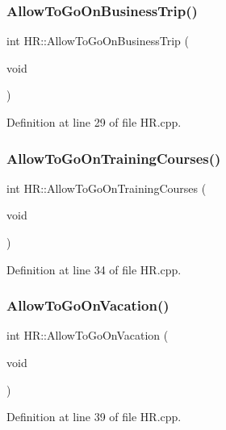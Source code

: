 \subsubsection{\texorpdfstring{Allow\+To\+Go\+On\+Business\+Trip()}{AllowToGoOnBusinessTrip()}}
{\footnotesize\ttfamily int H\+R\+::\+Allow\+To\+Go\+On\+Business\+Trip (\begin{DoxyParamCaption}\item[{void}]{ }\end{DoxyParamCaption})}



Definition at line 29 of file H\+R.\+cpp.

\mbox{\label{class_h_r_a1a6f8313fedc1e0ad25827b35cb80427}} 
\subsubsection{\texorpdfstring{Allow\+To\+Go\+On\+Training\+Courses()}{AllowToGoOnTrainingCourses()}}
{\footnotesize\ttfamily int H\+R\+::\+Allow\+To\+Go\+On\+Training\+Courses (\begin{DoxyParamCaption}\item[{void}]{ }\end{DoxyParamCaption})}



Definition at line 34 of file H\+R.\+cpp.

\mbox{\label{class_h_r_a890c8452142fee7556b7498785f10b6f}} 
\subsubsection{\texorpdfstring{Allow\+To\+Go\+On\+Vacation()}{AllowToGoOnVacation()}}
{\footnotesize\ttfamily int H\+R\+::\+Allow\+To\+Go\+On\+Vacation (\begin{DoxyParamCaption}\item[{void}]{ }\end{DoxyParamCaption})}



Definition at line 39 of file H\+R.\+cpp.

\mbox{\label{class_h_r_a7f7c6e9ee2f6010fbf53ceb94d18ddfb}} 
